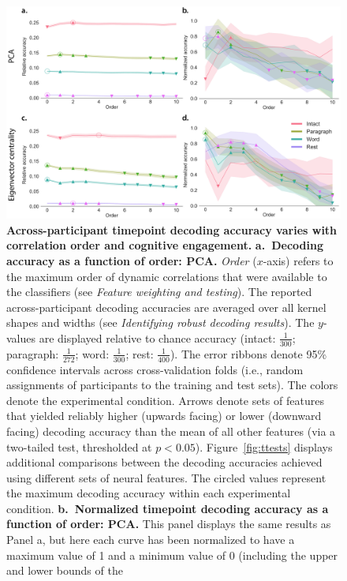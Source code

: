 \documentclass[english]{article}
\begin{document}
\begin{figure}[tp]
  \centering
  \includegraphics[width=\textwidth]{figs/decode_level}
  \caption{\textbf{Across-participant timepoint decoding accuracy varies with
      correlation order and cognitive engagement.}
    \textbf{a.~Decoding accuracy as a function of order: PCA.}
    \textit{Order} ($x$-axis) refers to the maximum order of dynamic
    correlations that were available to the classifiers (see
    \textit{Feature weighting and testing}).  The reported
    across-participant decoding accuracies are averaged over all
    kernel shapes and widths (see \textit{Identifying robust decoding
      results}).  The $y$-values are displayed relative to chance
    accuracy (intact: $\frac{1}{300}$; paragraph: $\frac{1}{272}$;
    word: $\frac{1}{300}$; rest: $\frac{1}{400}$).  The error ribbons
    denote 95\% confidence intervals across cross-validation folds
    (i.e., random assignments of participants to the training and test
    sets).  The colors denote the experimental condition.  Arrows
    denote sets of features that yielded reliably higher (upwards
    facing) or lower (downward facing) decoding accuracy than the mean
    of all other features (via a two-tailed test, thresholded at
    $p < 0.05$).  Figure~\ref{fig:ttests} displays additional
    comparisons between the decoding accuracies achieved using
    different sets of neural features.  The circled values represent
    the maximum decoding accuracy within each experimental condition.
    \textbf{b.~Normalized timepoint decoding accuracy as a function of order:
      PCA.}  This panel displays the same results as Panel a, but here
    each curve has been normalized to have a maximum value of 1 and a
    minimum value of 0 (including the upper and lower bounds of the
}
\end{figure}
\end{document}
